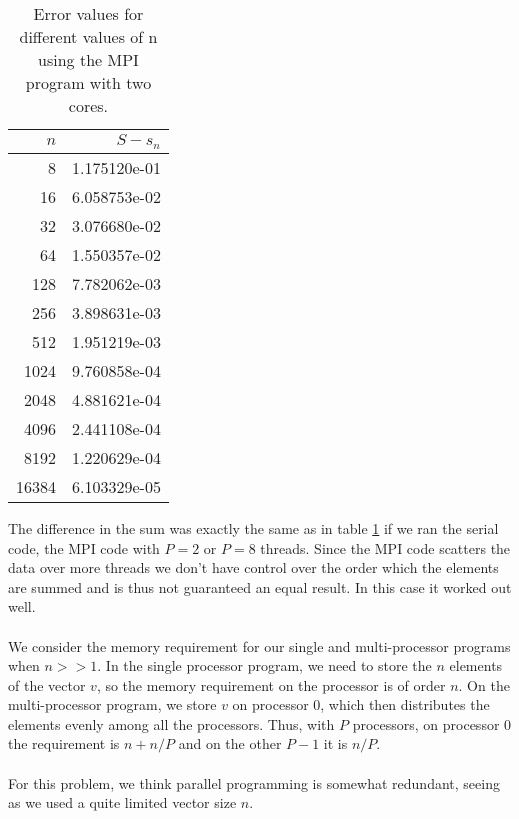 \documentclass{article}
\begin{document}
\begin{table}
\centering
\caption{Error values for different values of n using the MPI program with two cores.}
\label{tab:MPIerror}
\begin{tabular}{rr}
$n$ & $S-s_n$  \\ 
\hline 
8     & 1.175120e-01 \\ 
16    & 6.058753e-02 \\ 
32    & 3.076680e-02 \\ 
64    & 1.550357e-02 \\ 
128   & 7.782062e-03 \\ 
256   & 3.898631e-03 \\ 
512   & 1.951219e-03 \\ 
1024  & 9.760858e-04 \\ 
2048  & 4.881621e-04 \\ 
4096  & 2.441108e-04 \\ 
8192  & 1.220629e-04 \\ 
16384 & 6.103329e-05
\end{tabular}
\end{table} 
The difference in the sum was exactly the same as in table \ref{tab:MPIerror} if we ran the serial code, the MPI code with $P =2$ or $P = 8$ threads. Since the MPI code scatters the data over more threads we don't have control over the order which the elements are summed and is thus not guaranteed an equal result. In this case it worked out well.\\\\
We consider the memory requirement for our single and multi-processor programs when $n >> 1$. In the single processor program, we need to store the $n$ elements of the vector $v$, so the memory requirement on the processor is of order $n$. On the multi-processor program, we store $v$ on processor $0$, which then distributes the elements evenly among all the processors. Thus, with $P$ processors, on processor $0$ the requirement is $n + n/P$ and on the other $P-1$ it is $n/P$. \\ \\
For this problem, we think parallel programming is somewhat redundant, seeing as we used a quite limited  vector size $n$.
\end{document}
